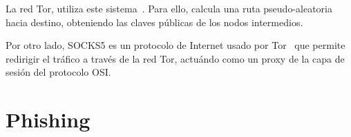 La red Tor, utiliza este sistema~\cite{TorAndrea2022}. Para ello, calcula una ruta pseudo-aleatoria hacia destino, obteniendo las claves públicas de los nodos intermedios.

Por otro lado, SOCKS5 es un protocolo de Internet usado por Tor~\cite{SOCKS5Tor2022} que permite redirigir el tráfico a través de la red Tor, actuándo como un proxy de la capa de sesión del protocolo OSI.






\section{Phishing}

